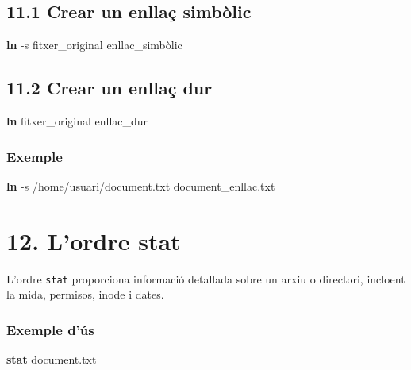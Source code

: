 \documentclass[
  12 pt,
  a4paper,
]{article}
\newenvironment{Shaded}{\begin{snugshade}}{\end{snugshade}}
\newcommand{\AttributeTok}[1]{\textcolor[rgb]{0.13,0.29,0.53}{#1}}
\newcommand{\FunctionTok}[1]{\textcolor[rgb]{0.13,0.29,0.53}{\textbf{#1}}}
\newcommand{\NormalTok}[1]{#1}
\begin{document}
\subsection{11.1 Crear un enllaç
simbòlic}\label{crear-un-enllauxe7-simbuxf2lic}

\begin{Shaded}
\begin{Highlighting}[]
\FunctionTok{ln} \AttributeTok{{-}s}\NormalTok{ fitxer\_original enllac\_simbòlic}
\end{Highlighting}
\end{Shaded}

\subsection{11.2 Crear un enllaç dur}\label{crear-un-enllauxe7-dur}

\begin{Shaded}
\begin{Highlighting}[]
\FunctionTok{ln}\NormalTok{ fitxer\_original enllac\_dur}
\end{Highlighting}
\end{Shaded}

\subsubsection{Exemple}\label{exemple-4}

\begin{Shaded}
\begin{Highlighting}[]
\FunctionTok{ln} \AttributeTok{{-}s}\NormalTok{ /home/usuari/document.txt document\_enllac.txt}
\end{Highlighting}
\end{Shaded}

\section{12. L'ordre stat}\label{lordre-stat}

L'ordre \texttt{stat} proporciona informació detallada sobre un arxiu o
directori, incloent la mida, permisos, inode i dates.

\subsubsection{Exemple d'ús}\label{exemple-duxfas-2}

\begin{Shaded}
\begin{Highlighting}[]
\FunctionTok{stat}\NormalTok{ document.txt}
\end{Highlighting}
\end{Shaded}
\end{document}
